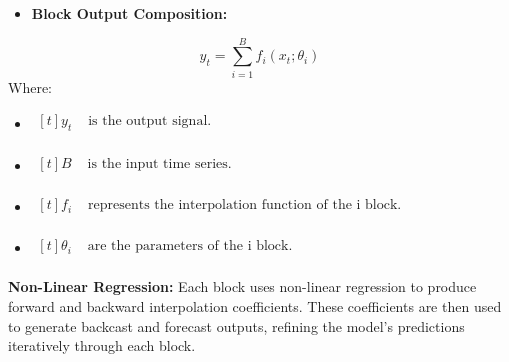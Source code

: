 \documentclass{ieeeojies}
\begin{document}
\begin{itemize}
    \item  \textbf{Block Output Composition:} 
\end{itemize}
\begin{equation}
y_t = \sum_{i=1}^B f_i(x_t; \theta_i)
\end{equation}
Where: 
\begin{itemize}
    \item $\begin{aligned}[t]
            y_t & \text{ is the output signal.} \\
            \end{aligned}$
    \item $\begin{aligned}[t]
            B & \text{ is the input time series.} \\
            \end{aligned}$
    \item $\begin{aligned}[t]
            f_i & \text{ represents the interpolation function of the i block.} \\
            \end{aligned}$
    \item $\begin{aligned}[t]
            \theta_i & \text{ are the parameters of the i block.} \\
            \end{aligned}$
\end{itemize}

\textbf{Non-Linear Regression:} Each block uses non-linear regression to produce forward and backward interpolation coefficients. These coefficients are then used to generate backcast and forecast outputs, refining the model’s predictions iteratively through each block.
\end{document}
